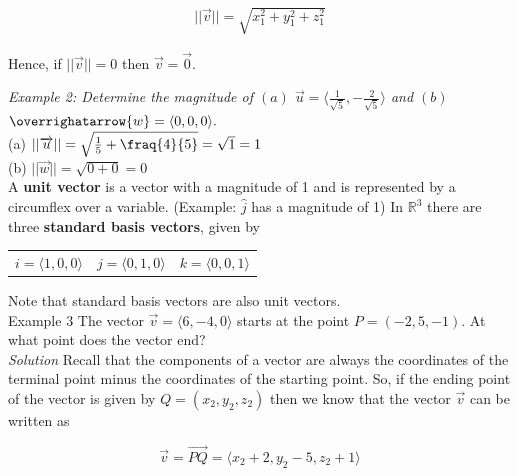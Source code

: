 \documentclass{article}
\begin{document}
            \begin{align*}
                ||\overrightarrow{v}||=\sqrt{x_1^2+y_1^2+z_1^2}
            \end{align*}

            \noindent Hence, if $||\overrightarrow{v}||=0$ then $\overrightarrow{v}=\overrightarrow{0}.$

            \noindent\color{blue} \textit{Example 2: Determine the magnitude of
            $(a)$ $\overrightarrow{u}=\langle\frac{1}{\sqrt{5}},-\frac{2}{\sqrt{5}}\rangle$ and
            $(b)$ $\overrighatarrow{w}=\langle0,0,0\rangle.$} \color{black} \\
            (a) $||\overrightarrow{u}||=\sqrt{\frac{1}{5}+\fraq{4}{5}}=\sqrt{1}=1$\\
            (b) $||\overrightarrow{w}||=\sqrt{0+0}=0$\\

            \noindent A \textbf{unit vector} is a vector with a magnitude of 1 and is represented
            by a circumflex over a variable. (Example: $\hat{j}$ has a magnitude of 1) In
            $\mathbb{R}^3$ there are three \textbf{standard basis vectors}, given by

            \begin{center}
                \begin{tabular}{ccc}
                    $i=\langle1,0,0\rangle$
                    & $j=\langle0,1,0\rangle$
                    & $k=\langle0,0,1\rangle$
                \end{tabular}
            \end{center}

            \noindent Note that standard basis vectors are also unit vectors.\\

            \noindent \color{blue} Example 3 \color{black} The vector
            $\overrightarrow{v}=\langle6,-4,0\rangle$ starts at the point $P=(-2,5,-1)$. At what
            point does the vector end?\\

            \noindent \emph{Solution} Recall that the components of a vector are always the coordinates of the
            terminal point minus the coordinates of the starting point. So, if the ending point of the
            vector is given by $Q=(x_2,y_2,z_2)$ then we know that the vector $\overrightarrow{v}$ can
            be written as

            \begin{equation*}
                \overrightarrow{v}=\overrightarrow{PQ}=\langle x_2+2,y_2-5,z_2+1\rangle
            \end{equation*}
\end{document}
